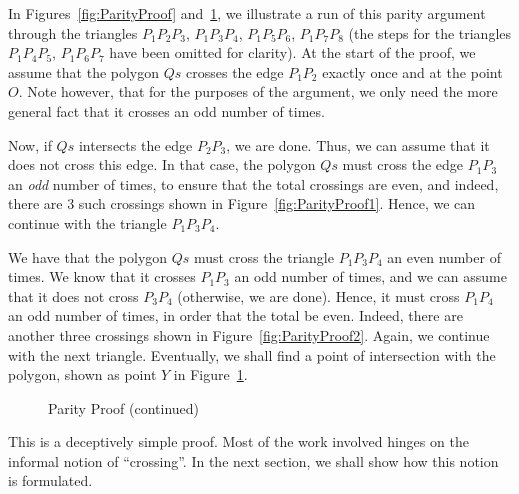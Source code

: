 In Figures~\ref{fig:ParityProof} and~\ref{fig:ParityProofCont}, we illustrate a run of this parity argument through the triangles $P_1P_2P_3$, $P_1P_3P_4$, $P_1P_5P_6$, $P_1P_7P_8$ (the steps for the triangles $P_1P_4P_5$, $P_1P_6P_7$ have been omitted for clarity). At the start of the proof, we assume that the polygon $Qs$ crosses the edge $P_1P_2$ exactly once and at the point $O$. Note however, that for the purposes of the argument, we only need the more general fact that it crosses an odd number of times. 

Now, if $Qs$ intersects the edge $P_2P_3$, we are done. Thus, we can assume that it does not cross this edge. In that case, the polygon $Qs$ must cross the edge $P_1P_3$ an \emph{odd} number of times, to ensure that the total crossings are even, and indeed, there are 3 such crossings shown in Figure~\ref{fig:ParityProof1}. Hence, we can continue with the triangle $P_1P_3P_4$. 

We have that the polygon $Qs$ must cross the triangle $P_1P_3P_4$ an even number of times. We know that it crosses $P_1P_3$ an odd number of times, and we can assume that it does not cross $P_3P_4$ (otherwise, we are done). Hence, it must cross $P_1P_4$ an odd number of times, in order that the total be even. Indeed, there are another three crossings shown in Figure~\ref{fig:ParityProof2}. Again, we continue with the next triangle. Eventually, we shall find a point of intersection with the polygon, shown as point $Y$ in Figure~\ref{fig:ParityProofCont}.

\begin{figure}
\caption{Parity Proof (continued)}
\label{fig:ParityProofCont}
\end{figure}

This is a deceptively simple proof. Most of the work involved hinges on the informal notion of ``crossing''. In the next section, we shall show how this notion is formulated.



